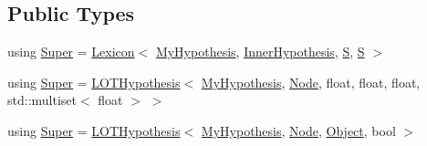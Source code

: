 \subsection*{Public Types}
\begin{DoxyCompactItemize}
\item 
using \hyperlink{class_my_hypothesis_a266742f266abc638ddc1d1870d735313}{Super} = \hyperlink{class_lexicon}{Lexicon}$<$ \hyperlink{class_my_hypothesis}{My\+Hypothesis}, \hyperlink{class_inner_hypothesis}{Inner\+Hypothesis}, \hyperlink{_formal_language_theory-_complex_2_main_8cpp_a51c40915539205f0b5add30b0d68a4cb}{S}, \hyperlink{_formal_language_theory-_complex_2_main_8cpp_a51c40915539205f0b5add30b0d68a4cb}{S} $>$
\item 
using \hyperlink{class_my_hypothesis_aab716e490381d01aeb22e525eb90e863}{Super} = \hyperlink{class_l_o_t_hypothesis}{L\+O\+T\+Hypothesis}$<$ \hyperlink{class_my_hypothesis}{My\+Hypothesis}, \hyperlink{class_node}{Node}, float, float, float, std\+::multiset$<$ float $>$ $>$
\item 
using \hyperlink{class_my_hypothesis_a8621c1813f3fb8590df10e75be30d4cb}{Super} = \hyperlink{class_l_o_t_hypothesis}{L\+O\+T\+Hypothesis}$<$ \hyperlink{class_my_hypothesis}{My\+Hypothesis}, \hyperlink{class_node}{Node}, \hyperlink{struct_object}{Object}, bool $>$
\end{DoxyCompactItemize}

